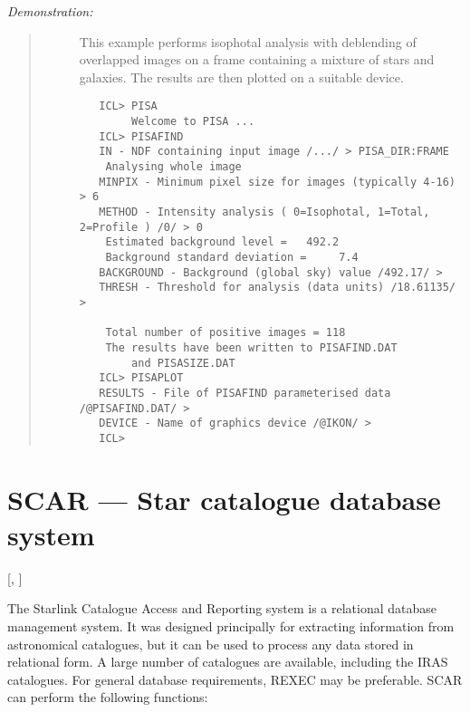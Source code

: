 {\em Demonstration:}\hfill
\begin{quote}
\begin{description}
\item [] This example performs isophotal analysis with deblending of overlapped
images on a frame containing a mixture of stars and galaxies.
The results are then plotted on a suitable device.

\begin{small}
\begin{verbatim}
   ICL> PISA
        Welcome to PISA ...
   ICL> PISAFIND
   IN - NDF containing input image /.../ > PISA_DIR:FRAME
    Analysing whole image
   MINPIX - Minimum pixel size for images (typically 4-16) > 6
   METHOD - Intensity analysis ( 0=Isophotal, 1=Total, 2=Profile ) /0/ > 0
    Estimated background level =   492.2
    Background standard deviation =     7.4
   BACKGROUND - Background (global sky) value /492.17/ >
   THRESH - Threshold for analysis (data units) /18.61135/ >

    Total number of positive images = 118
    The results have been written to PISAFIND.DAT
        and PISASIZE.DAT
   ICL> PISAPLOT
   RESULTS - File of PISAFIND parameterised data /@PISAFIND.DAT/ >
   DEVICE - Name of graphics device /@IKON/ >
   ICL>
\end{verbatim}
\end{small}

\end{description}
\end{quote}

\newpage

\section{SCAR --- Star catalogue database system}

\vspace{-11mm}

\hfill [, ]

\vspace{5mm}

The Starlink Catalogue Access and Reporting system is a relational database
management system.
It was designed principally for extracting information from astronomical
catalogues, but it can be used to process any data stored in relational form.
A large number of catalogues are available, including the IRAS catalogues.
For general database requirements, REXEC may be preferable.
SCAR can perform the following functions:


